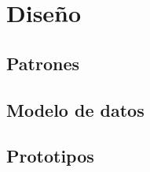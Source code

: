 
\chapter{Diseño}\label{diseno}
\section{Patrones}\label{sec:patrones}

\section{Modelo de datos}\label{sec:modelo_datos}

\section{Prototipos}\label{sec:protoripos}